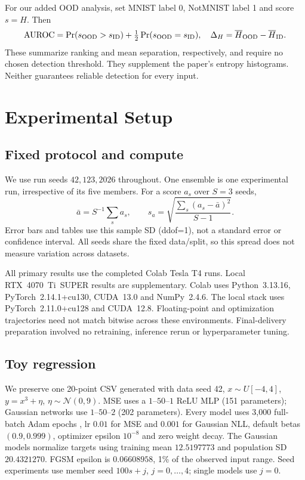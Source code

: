 \documentclass[11pt,a4paper]{article}
\begin{document}
For our added OOD analysis, set MNIST label 0, NotMNIST label 1 and score $s=H$. Then
\begin{equation}
\mathrm{AUROC}=\Pr(s_{\rm OOD}>s_{\rm ID})+\tfrac12\Pr(s_{\rm OOD}=s_{\rm ID}),\quad
\Delta_H=\overline H_{\rm OOD}-\overline H_{\rm ID}.\label{eq:ood}
\end{equation}
These summarize ranking and mean separation, respectively, and require no chosen detection threshold. They supplement the paper's entropy histograms. Neither guarantees reliable detection for every input.

\section{Experimental Setup}
\label{sec:setup}
\subsection{Fixed protocol and compute}
We use run seeds $42,123,2026$ throughout. One ensemble is one experimental run, irrespective of its five members. For a score $a_s$ over $S=3$ seeds,
\begin{equation}
\bar a=S^{-1}\sum_s a_s,\qquad s_a=\sqrt{\frac{\sum_s(a_s-\bar a)^2}{S-1}}.
\end{equation}
Error bars and tables use this sample SD (ddof=1), not a standard error or confidence interval. All seeds share the fixed data/split, so this spread does not measure variation across datasets.

All primary results use the completed Colab Tesla T4 runs. Local RTX~4070~Ti~SUPER results are supplementary. Colab uses Python~3.13.16, PyTorch~2.14.1+cu130, CUDA~13.0 and NumPy~2.4.6. The local stack uses PyTorch~2.11.0+cu128 and CUDA~12.8. Floating-point and optimization trajectories need not match bitwise across these environments. Final-delivery preparation involved no retraining, inference rerun or hyperparameter tuning.

\subsection{Toy regression}
We preserve one 20-point CSV generated with data seed 42, $x\sim U[-4,4]$, $y=x^3+\eta$, $\eta\sim\mathcal N(0,9)$. MSE uses a $1$--$50$--$1$ ReLU MLP (151 parameters); Gaussian networks use $1$--$50$--$2$ (202 parameters). Every model uses 3,000 full-batch Adam epochs \citep{kingma2015adam}, lr $0.01$ for MSE and $0.001$ for Gaussian NLL, default betas $(0.9,0.999)$, optimizer epsilon $10^{-8}$ and zero weight decay. The Gaussian models normalize targets using training mean $12.5197773$ and population SD $20.4321270$. FGSM epsilon is $0.06608958$, 1\% of the observed input range. Seed experiments use member seed $100s+j$, $j=0,\ldots,4$; single models use $j=0$.
\end{document}
